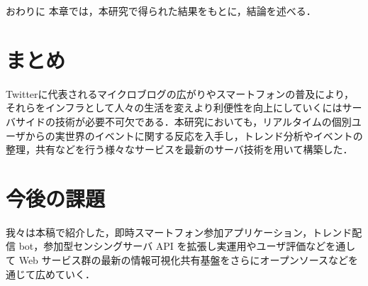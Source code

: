 \chapterhead
{おわりに}
{本章では，本研究で得られた結果をもとに，結論を述べる．}

\section{まとめ}
Twitterに代表されるマイクロブログの広がりやスマートフォンの普及により，それらをインフラとして人々の生活を変えより利便性を向上にしていくにはサーバサイドの技術が必要不可欠である．本研究においても，リアルタイムの個別ユーザからの実世界のイベントに関する反応を入手し，トレンド分析やイベントの整理，共有などを行う様々なサービスを最新のサーバ技術を用いて構築した．

\section{今後の課題}
我々は本稿で紹介した，即時スマートフォン参加アプリケーション，トレンド配信 bot，参加型センシングサーバ API を拡張し実運用やユーザ評価などを通して Web サービス群の最新の情報可視化共有基盤をさらにオープンソースなどを通じて広めていく．
